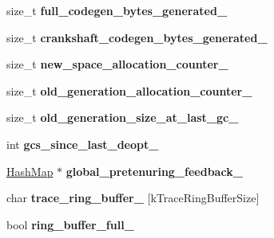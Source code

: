 \begin{DoxyCompactItemize}
\item 
size\+\_\+t {\bfseries full\+\_\+codegen\+\_\+bytes\+\_\+generated\+\_\+}\hypertarget{classv8_1_1internal_1_1_heap_ae2401ab201f436292b23dfce73acc893}{}\label{classv8_1_1internal_1_1_heap_ae2401ab201f436292b23dfce73acc893}

\item 
size\+\_\+t {\bfseries crankshaft\+\_\+codegen\+\_\+bytes\+\_\+generated\+\_\+}\hypertarget{classv8_1_1internal_1_1_heap_a65adb2adf4f614940bf0e287757f9f9d}{}\label{classv8_1_1internal_1_1_heap_a65adb2adf4f614940bf0e287757f9f9d}

\item 
size\+\_\+t {\bfseries new\+\_\+space\+\_\+allocation\+\_\+counter\+\_\+}\hypertarget{classv8_1_1internal_1_1_heap_ad461ccb060fa79499cc897c440c7bb72}{}\label{classv8_1_1internal_1_1_heap_ad461ccb060fa79499cc897c440c7bb72}

\item 
size\+\_\+t {\bfseries old\+\_\+generation\+\_\+allocation\+\_\+counter\+\_\+}\hypertarget{classv8_1_1internal_1_1_heap_a9ce520a852fec92357cd4893549caf32}{}\label{classv8_1_1internal_1_1_heap_a9ce520a852fec92357cd4893549caf32}

\item 
size\+\_\+t {\bfseries old\+\_\+generation\+\_\+size\+\_\+at\+\_\+last\+\_\+gc\+\_\+}\hypertarget{classv8_1_1internal_1_1_heap_a0dd5a03b177ab6666e16b91e407a39c4}{}\label{classv8_1_1internal_1_1_heap_a0dd5a03b177ab6666e16b91e407a39c4}

\item 
int {\bfseries gcs\+\_\+since\+\_\+last\+\_\+deopt\+\_\+}\hypertarget{classv8_1_1internal_1_1_heap_a4549e06bbb86d1e1ba53da72a6c014a9}{}\label{classv8_1_1internal_1_1_heap_a4549e06bbb86d1e1ba53da72a6c014a9}

\item 
\hyperlink{classv8_1_1internal_1_1_template_hash_map_impl}{Hash\+Map} $\ast$ {\bfseries global\+\_\+pretenuring\+\_\+feedback\+\_\+}\hypertarget{classv8_1_1internal_1_1_heap_a71e0a1531749556d52013dacdb153410}{}\label{classv8_1_1internal_1_1_heap_a71e0a1531749556d52013dacdb153410}

\item 
char {\bfseries trace\+\_\+ring\+\_\+buffer\+\_\+} \mbox{[}k\+Trace\+Ring\+Buffer\+Size\mbox{]}\hypertarget{classv8_1_1internal_1_1_heap_a3a2458388980a626eb99e012acfc0b65}{}\label{classv8_1_1internal_1_1_heap_a3a2458388980a626eb99e012acfc0b65}

\item 
bool {\bfseries ring\+\_\+buffer\+\_\+full\+\_\+}\hypertarget{classv8_1_1internal_1_1_heap_a36a06239e69325ead2ba18c142886710}{}\label{classv8_1_1internal_1_1_heap_a36a06239e69325ead2ba18c142886710}


\end{DoxyCompactItemize}
